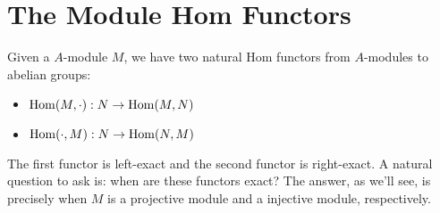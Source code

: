 \section{The Module Hom Functors}
Given a $A$-module $M$, we have two natural Hom functors from $A$-modules to abelian groups:
\begin{itemize}
    \item $\operatorname{Hom}(M, \cdot): N \rightarrow \operatorname{Hom}(M, N)$
    \item $\operatorname{Hom}(\cdot, M): N \rightarrow \operatorname{Hom}(N, M)$
\end{itemize}
The first functor is left-exact and the second functor is right-exact. A natural question to ask is: when are these functors exact? The answer, as we'll see, is precisely when $M$ is a projective module and a injective module, respectively.
